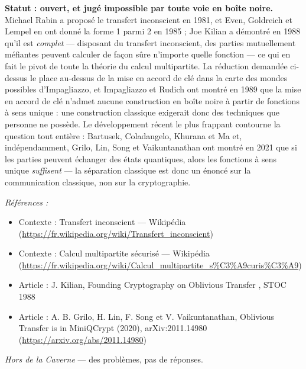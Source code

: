 \documentclass[11pt]{article}
\newenvironment{refs}{\par\small\noindent\emph{Références :}\begin{itemize}\setlength\itemsep{0pt}}{\end{itemize}\normalsize}
\begin{document}
\noindent \textbf{Statut : ouvert, et jugé impossible par toute voie en boîte noire.}
Michael Rabin a proposé le transfert inconscient en 1981, et Even, Goldreich et Lempel en ont
donné la forme 1 parmi 2 en 1985 ; Joe Kilian a démontré en 1988 qu'il est \textit{complet} ---
disposant du transfert inconscient, des parties mutuellement méfiantes peuvent calculer de
façon sûre n'importe quelle fonction --- ce qui en fait le pivot de toute la théorie du calcul
multipartite. La réduction demandée ci-dessus le place au-dessus de la mise en accord de clé
dans la carte des mondes possibles d'Impagliazzo, et Impagliazzo et Rudich ont montré en 1989
que la mise en accord de clé n'admet aucune construction en boîte noire à partir de fonctions
à sens unique : une construction classique exigerait donc des techniques que personne ne
possède. Le développement récent le plus frappant contourne la question tout entière :
Bartusek, Coladangelo, Khurana et Ma et, indépendamment, Grilo, Lin, Song et Vaikuntanathan
ont montré en 2021 que si les parties peuvent échanger des états quantiques, alors les
fonctions à sens unique \textit{suffisent} --- la séparation classique est donc un énoncé sur la
communication classique, non sur la cryptographie.

\begin{refs}
\item Contexte : Transfert inconscient --- Wikipédia (\url{https://fr.wikipedia.org/wiki/Transfert_inconscient})
\item Contexte : Calcul multipartite sécurisé --- Wikipédia (\url{https://fr.wikipedia.org/wiki/Calcul_multipartite_s%C3%A9curis%C3%A9})
\item Article : J. Kilian, \og{} Founding Cryptography on Oblivious Transfer \fg{}, STOC 1988
\item Article : A. B. Grilo, H. Lin, F. Song et V. Vaikuntanathan, \og{} Oblivious Transfer is in MiniQCrypt \fg{} (2020), arXiv:2011.14980 (\url{https://arxiv.org/abs/2011.14980})
\end{refs}

\bigskip


\vfill
\noindent\emph{Hors de la Caverne} --- des probl\`emes, pas de r\'eponses.
\end{document}
